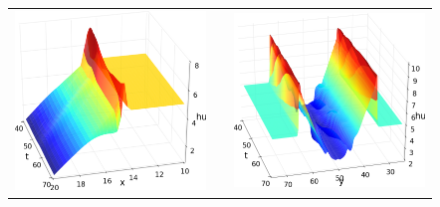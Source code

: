\documentclass[preprint, 11pt]{article}
\begin{document}
{\begin{figure}[!h]
{\begin{tabular}{ccc}
      \\
      \includegraphics[scale=0.25,valign=t]{figures/slices_of_hu_blended_at_y50.png}
      & &
      \includegraphics[scale=0.25,valign=t]{figures/slices_of_hu_blended_at_x18.png}
      \end{tabular}
    }
    \quad
    \subfloat[Location of the shock along $y=50$. \label{fig:pos_of_shock}]{
}
\end{figure}}
\end{document}
